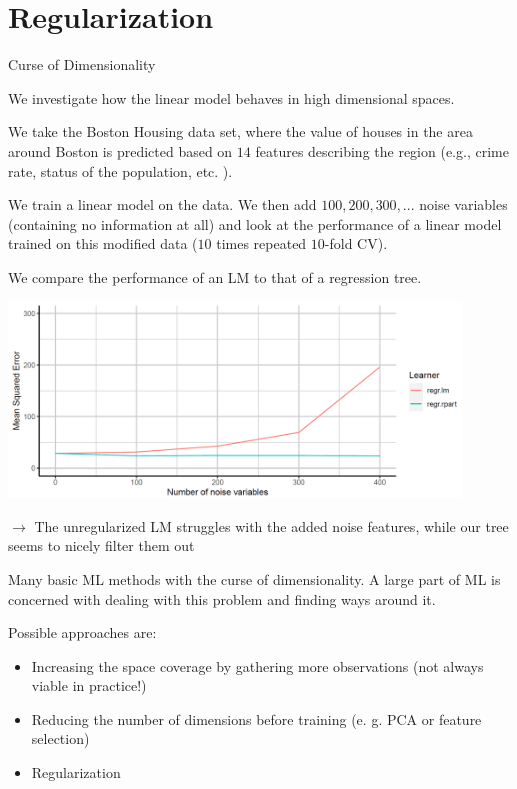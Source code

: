 \section{Regularization}

\begin{vbframe}{Curse of Dimensionality}

We investigate how the linear model behaves in high dimensional
spaces.

\vfill

We take the Boston Housing data set, where the value of houses in the
area around Boston is predicted based on \(14\) features describing the
region (e.g., crime rate, status of the population, etc. ).

\vfill

We train a linear model on the data. We then add \(100, 200, 300, ...\)
noise variables (containing no information at all) and look at the
performance of a linear model trained on this modified data (\(10\)
times repeated \(10\)-fold CV).

\framebreak

We compare the performance of an LM to that of a regression tree.

\begin{center}
\includegraphics[width=0.9\textwidth]{plots/curse-of-dim.png}
\end{center}

\(\to\) The unregularized LM struggles with the added noise features,
while our tree seems to nicely filter them out

\framebreak

Many basic ML methods with the curse of dimensionality. A
large part of ML is concerned with dealing with this problem and finding
ways around it.

\vfill

Possible approaches are:

\begin{itemize}

\item
  Increasing the space coverage by gathering more observations (not
  always viable in practice!)
\item
  Reducing the number of dimensions before training (e. g. PCA or
  feature selection)
\item
  Regularization
\end{itemize}

\end{vbframe}


